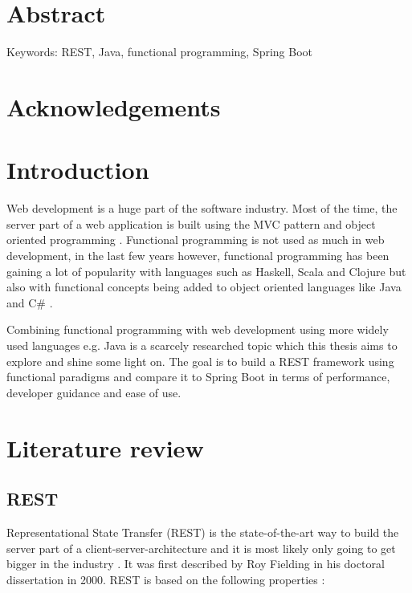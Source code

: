 \documentclass[a4paper]{article}
\begin{document}
\newpage
\section*{Abstract}
\blindtext
\newline

\noindent Keywords: REST, Java, functional programming, Spring Boot

\newpage
\section*{Acknowledgements}
\blindtext

\newpage

\tableofcontents

\newpage

\section{Introduction}

Web development is a huge part of the software industry. Most of the time, the
server part of a web application is built using the MVC pattern and object
oriented programming \cite{damir2021architecture}. Functional programming is not
used as much in web development, in the last few years however, functional
programming has been gaining a lot of popularity with languages such as Haskell,
Scala and Clojure but also with functional concepts being added to object
oriented languages like Java and C\# \cite{klint2022functional}.\newline

\noindent Combining functional programming with web development using more
widely used languages e.g. Java is a scarcely researched topic which this thesis
aims to explore and shine some light on. The goal is to build a REST framework
using functional paradigms and compare it to Spring Boot in terms of
performance, developer guidance and ease of use.

\section{Literature review}
\subsection{REST}

Representational State Transfer (REST) is the state-of-the-art way to build the
server part of a client-server-architecture and it is most likely only going to
get bigger in the industry \cite{halili2018web}. It was first described by Roy
Fielding in his doctoral dissertation in 2000. REST is based on the following
properties \cite{fielding2000architectural}:
\end{document}
